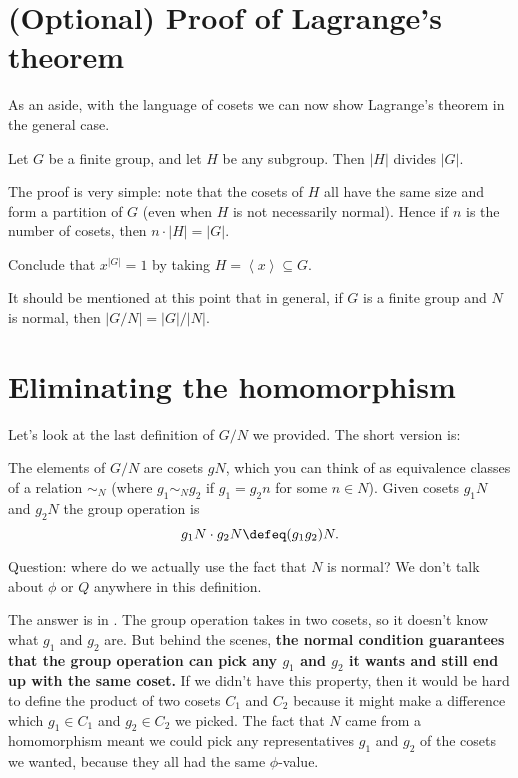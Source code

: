 \section{(Optional) Proof of Lagrange's theorem}
As an aside, with the language of cosets
we can now show Lagrange's theorem in the general case.
\begin{theorem}
	\label{thm:lagrange_grp}
	Let $G$ be a finite group, and let $H$ be any subgroup.
	Then $\left\lvert H \right\rvert$ divides $\left\lvert G \right\rvert$.
\end{theorem}

The proof is very simple: note that the cosets of $H$
all have the same size and form a partition of $G$
(even when $H$ is not necessarily normal).
Hence if $n$ is the number of cosets,
then $n \cdot \left\lvert H \right\rvert = \left\lvert G \right\rvert$.

\begin{ques}
	Conclude that $x^{\left\lvert G \right\rvert}=1$
	by taking $H = \left<x\right> \subseteq G$.
\end{ques}

\begin{remark}
	It should be mentioned at this point that
	in general, if $G$ is a finite group and $N$ is normal,
	then $|G/N| = |G| / |N|$.
\end{remark}

\section{Eliminating the homomorphism}
Let's look at the last definition of $G/N$ we provided.
The short version is:
\begin{itemize}
	\ii The elements of $G/N$ are cosets $gN$, which you can think
	of as equivalence classes of a relation $\sim_N$
	(where $g_1 \sim_N g_2$ if $g_1 = g_2n$ for some $n \in N$).
	\ii Given cosets $g_1N$ and $g_2N$ the group operation is
	\[ g_1N \cdot g_2N \defeq (g_1g_2)N. \]
\end{itemize}
Question: where do we actually use the fact that $N$ is normal?
We don't talk about $\phi$ or $Q$ anywhere in this definition.

The answer is in .
The group operation takes in two cosets,
so it doesn't know what $g_1$ and $g_2$ are.
But behind the scenes,
\textbf{the normal condition guarantees that the group operation can pick
any $g_1$ and $g_2$ it wants and still end up with the same coset.}
If we didn't have this property, then it would be hard to define the
product of two cosets $C_1$ and $C_2$ because it might make a difference
which $g_1 \in C_1$ and $g_2 \in C_2$ we picked.
The fact that $N$ came from a homomorphism meant we could pick any representatives
$g_1$ and $g_2$ of the cosets we wanted, because they all had the same $\phi$-value.

